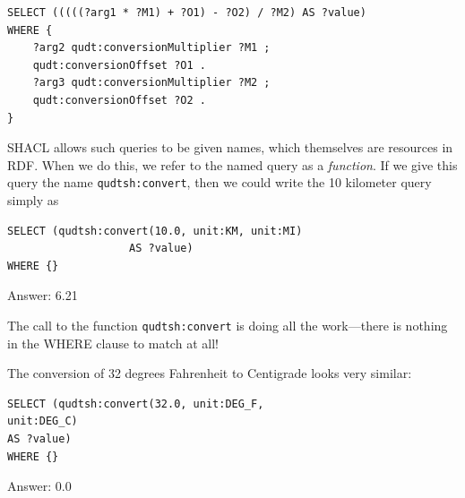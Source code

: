\begin{lstlisting}
SELECT (((((?arg1 * ?M1) + ?O1) - ?O2) / ?M2) AS ?value)
WHERE {
    ?arg2 qudt:conversionMultiplier ?M1 ;
    qudt:conversionOffset ?O1 .
    ?arg3 qudt:conversionMultiplier ?M2 ;
    qudt:conversionOffset ?O2 .
}
\end{lstlisting}


SHACL allows such queries to be given names, which themselves are
resources in RDF.   When we do this, we refer to the named query 
as a \emph{function}.  If we give this query the 
name \texttt{qudtsh:convert}, then
we could write the 10 kilometer query simply as

\begin{query}
\begin{lstlisting}
SELECT (qudtsh:convert(10.0, unit:KM, unit:MI)
                   AS ?value)
WHERE {}
\end{lstlisting}
\end{query}

Answer: 6.21

The call to the function \texttt{qudtsh:convert} is doing all the work---there is
nothing in the
WHERE clause to match at all!

The conversion of 32 degrees Fahrenheit to Centigrade looks very
similar:

\begin{lstlisting}
SELECT (qudtsh:convert(32.0, unit:DEG_F,
unit:DEG_C)
AS ?value)
WHERE {}
\end{lstlisting}


Answer: 0.0

